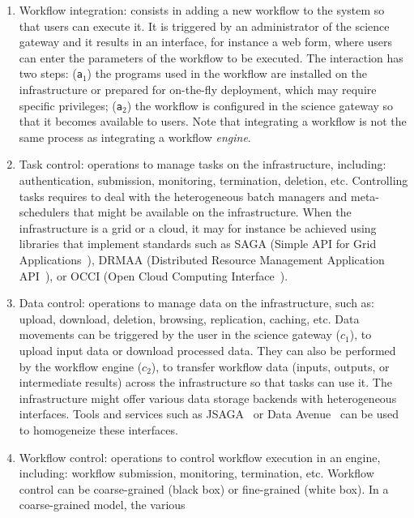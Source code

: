 \documentclass[preprint,3p,twocolumn]{elsarticle}
\begin{document}
\begin{enumerate}[leftmargin=0cm,itemindent=0.65cm,label=\texttt{(\alph*)}]

\item Workflow integration: consists in adding a new workflow to the
  system so that users can execute it. It is triggered by an
  administrator of the science gateway and it results in an interface,
  for instance a web form, where users can enter the parameters of the
  workflow to be executed. The interaction has two steps:
  (\texttt{a$_1$}) the programs used in the workflow are installed on
  the infrastructure or prepared for on-the-fly deployment, which
  may require specific privileges; (\texttt{a$_2$}) the
  workflow is configured in the science gateway so that it becomes
  available to users. Note that integrating a workflow is not the same
  process as integrating a workflow \emph{engine}.
\item Task control: operations to manage tasks on the infrastructure,
  including: authentication, submission, monitoring, termination,
  deletion, etc. Controlling tasks requires to deal with the
  heterogeneous batch managers and meta-schedulers that might be
  available on the infrastructure. When the infrastructure is a grid
  or a cloud, it may for instance be achieved using libraries that
  implement standards such as SAGA (Simple API for Grid
  Applications~\cite{goodale2006saga}), DRMAA (Distributed Resource
  Management Application API~\cite{troger2012distributed}), or OCCI
  (Open Cloud Computing Interface~\cite{edmonds2012toward}).
\item Data control: operations to manage data on the infrastructure,
  such as: upload, download, deletion, browsing, replication, caching,
  etc. Data movements can be triggered by the user in the science
  gateway (\texttt{$c_1$}), to upload input data or download processed
  data. They can also be performed by the workflow engine
  (\texttt{$c_2$}), to transfer workflow data (inputs, outputs, or
  intermediate results) across the infrastructure so that tasks can
  use it. The infrastructure might offer various data storage backends
  with heterogeneous interfaces. 
  Tools and services such as JSAGA~\cite{reynaud2010uniform} or Data Avenue~\cite{hajnal2014data}
  can be used to homogeneize these interfaces.
\item Workflow control: operations to control workflow execution in an
  engine, including: workflow submission, monitoring, termination,
  etc. Workflow control can be coarse-grained (black box) or
  fine-grained (white box). In a coarse-grained model, the various

\end{enumerate}
\end{document}

